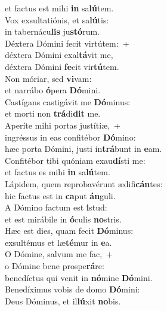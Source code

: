 \evenverse et factus est mihi \textbf{in} sa\textbf{lú}tem.\\
\oddverse Vox exsultatiónis, et sa\textbf{lú}tis:~\*\\
\oddverse in tabernácu\textbf{lis} ju\textbf{stó}rum.\\
\evenverse Déxtera Dómini fecit virtútem:~+\\
\evenverse  déxtera Dómini exal\textbf{tá}vit me,~\*\\
\evenverse déxtera Dómini \textbf{fe}cit vir\textbf{tú}tem.\\
\oddverse Non móriar, sed \textbf{vi}vam:~\*\\
\oddverse et narrábo \textbf{ó}pera \textbf{Dó}mini.\\
\evenverse Castígans castigávit me \textbf{Dó}minus:~\*\\
\evenverse et morti non \textbf{trá}di\textbf{dit} me.\\
\oddverse Aperíte mihi portas justítiæ,~+\\
\oddverse  ingréssus in eas confitébor \textbf{Dó}mino:~\*\\
\oddverse hæc porta Dómini, justi in\textbf{trá}bunt in \textbf{e}am.\\
\evenverse Confitébor tibi quóniam exau\textbf{dí}sti me:~\*\\
\evenverse et factus es mihi \textbf{in} sa\textbf{lú}tem.\\
\oddverse Lápidem, quem reprobavérunt ædifi\textbf{cán}tes:~\*\\
\oddverse hic factus est in \textbf{ca}put \textbf{án}guli.\\
\evenverse A Dómino factum est \textbf{i}stud:~\*\\
\evenverse et est mirábile in \textbf{ó}culis \textbf{no}stris.\\
\oddverse Hæc est dies, quam fecit \textbf{Dó}minus:~\*\\
\oddverse exsultémus et læ\textbf{té}mur in \textbf{e}a.\\
\evenverse O Dómine, salvum me fac,~+\\
\evenverse  o Dómine bene prospe\textbf{rá}re:~\*\\
\evenverse benedíctus qui venit in \textbf{nó}mine \textbf{Dó}mini.\\
\oddverse Benedíximus vobis de domo \textbf{Dó}mini:~\*\\
\oddverse Deus Dóminus, et il\textbf{lú}xit \textbf{no}bis.\\
